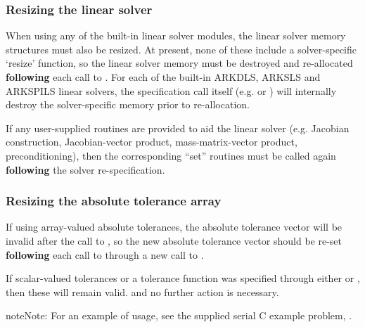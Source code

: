\documentclass[letterpaper,10pt,english]{sphinxmanual}
\begin{document}
\subsubsection{Resizing the linear solver}
\label{c_interface/User_callable:resizing-the-linear-solver}
When using any of the built-in linear solver modules, the linear
solver memory structures must also be resized.  At present, none of
these include a solver-specific `resize' function, so the linear
solver memory must be destroyed and re-allocated \textbf{following} each
call to {\hyperref[c_interface/User_callable:c.ARKodeResize]{\emph{}}}.  For each of the built-in ARKDLS,
ARKSLS and ARKSPILS linear solvers, the specification call itself
(e.g. {\hyperref[c_interface/User_callable:c.ARKDense]{\emph{}}} or {\hyperref[c_interface/User_callable:c.ARKSpgmr]{\emph{}}}) will internally
destroy the solver-specific memory prior to re-allocation.

If any user-supplied routines are provided to aid the linear solver
(e.g. Jacobian construction, Jacobian-vector product,
mass-matrix-vector product, preconditioning), then the corresponding
``set'' routines must be called again \textbf{following} the solver
re-specification.


\subsubsection{Resizing the absolute tolerance array}
\label{c_interface/User_callable:resizing-the-absolute-tolerance-array}
If using array-valued absolute tolerances, the absolute tolerance
vector will be invalid after the call to {\hyperref[c_interface/User_callable:c.ARKodeResize]{\emph{}}}, so
the new absolute tolerance vector should be re-set \textbf{following} each
call to {\hyperref[c_interface/User_callable:c.ARKodeResize]{\emph{}}} through a new call to
{\hyperref[c_interface/User_callable:c.ARKodeSVtolerances]{\emph{}}}.

If scalar-valued tolerances or a tolerance function was specified
through either {\hyperref[c_interface/User_callable:c.ARKodeSStolerances]{\emph{}}} or
{\hyperref[c_interface/User_callable:c.ARKodeWFtolerances]{\emph{}}}, then these will remain valid. and no
further action is necessary.

\begin{notice}{note}{Note:}
For an example of {\hyperref[c_interface/User_callable:c.ARKodeResize]{\emph{}}} usage, see the
supplied serial C example problem, .
\end{notice}
\end{document}
